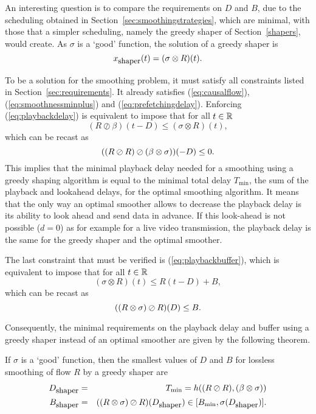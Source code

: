 An interesting question is to compare the requirements on $D$ and $B$, due to the scheduling obtained in Section~\ref{sec:smoothingstrategies}, which are minimal, with those that a simpler scheduling, namely the greedy shaper of Section~\ref{shapers}, would create. As $\sigma$ is a `good' function, the solution of a greedy shaper is
\begin{equation}
\mylabel{eq:shapingsolution}
x_{\mbox{\small shaper}}(t) = (\sigma \otimes R)(t).
\end{equation}

To be a solution for the smoothing problem, it must satisfy all constraints listed in Section~\ref{sec:requirements}. It already satisfies (\ref{eq:causalflow}), (\ref{eq:smoothnessminplus}) and (\ref{eq:prefetchingdelay}). Enforcing (\ref{eq:playbackdelay}) is equivalent to impose that for all $t \in \mathbb{R}$
$$  (R \oslash \beta)(t-D) \leq  (\sigma \otimes R)(t),  $$
which can be recast as
\begin{equation}
\mylabel{eq:shapingsolutionconstraint1}
 ((R \oslash R) \oslash (\beta \otimes \sigma)) (-D) \leq 0.
\end{equation}
This implies that the minimal playback delay needed for a smoothing using a greedy shaping algorithm is equal to the minimal total delay $T_{\min}$, the sum of the playback and lookahead delays, for the optimal smoothing algorithm. It means that the only way an optimal smoother allows to decrease the playback delay is its ability to look ahead and send data in advance. If this look-ahead is not possible ($d=0$) as for example for a live video transmission, the playback delay is the same for the greedy shaper and the optimal smoother.

The last constraint that must be verified is (\ref{eq:playbackbuffer}), which is equivalent to impose that for all $t \in \mathbb{R}$
$$ (\sigma \otimes R)(t) \leq R(t-D) + B, $$
which can be recast as
\begin{equation}
\mylabel{eq:shapingsolutionconstraint2}
 ((R \otimes \sigma) \oslash R) (D) \leq B.
\end{equation}

Consequently, the minimal requirements on the playback delay and buffer using a greedy shaper instead of an optimal smoother are given by the following theorem.

\begin{theorem}
If $\sigma$ is a `good' function, then the smallest values of $D$ and $B$ for lossless smoothing of flow $R$ by a greedy shaper are
\begin{eqnarray}
\mylabel{eq:optimalshaperdelay}
D_{\mbox{\small shaper}} & = & T_{\min}  =  h ((R \oslash R),  (\beta \otimes \sigma)) \\
\mylabel{eq:optimalplaybackbuffershaper}
B_{\mbox{\small shaper}} & = & ((R \otimes \sigma) \oslash R) (D_{\mbox{\small shaper}}) \in [B_{\min}, \sigma(D_{\mbox{\small shaper}}) ].
\end{eqnarray}
\end{theorem}

